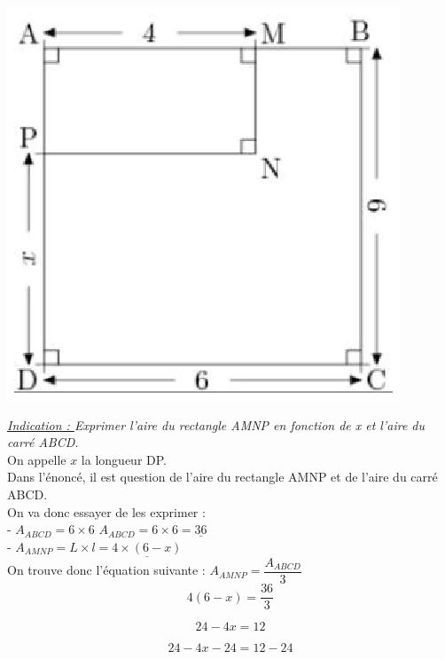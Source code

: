 \documentclass[a4paper,11pt]{article}
\begin{document}
\begin{center}
\includegraphics[scale=0.9]{carre.eps} 

\end{center}

\textit{\underline{Indication : } Exprimer l'aire du rectangle AMNP en fonction de x et l'aire du carré ABCD.}\\ 

\color{red}
On appelle $x$ la longueur DP.\\


Dans l'énoncé, il est question de l'aire du rectangle AMNP et de l'aire du carré ABCD.\\
On va donc essayer de les exprimer  :\\

- $A_{ABCD} = 6 \times 6$ \hspace*{1cm} $A_{ABCD} = 6 \times 6 = \underline{36} $ \\

- $A_{AMNP} = L \times l = \underline{4 \times (6-x)}$\\

On trouve donc l'équation suivante : \hspace*{1cm} $A_{AMNP} = \dfrac{A_{ABCD}}{3}$\\

$$4(6-x)=\dfrac{36}{3} $$

$$24-4x=12 $$

$$24-4x -24=12-24 $$
\end{document}
